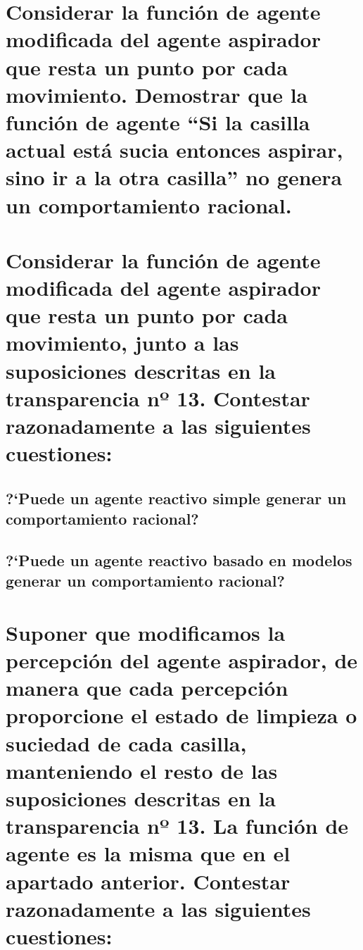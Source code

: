 \documentclass[10pt, a4paper,spanish]{article}
\begin{document}
	\section{Considerar la función de agente modificada del agente aspirador que resta un punto por cada movimiento. Demostrar que la función de agente “Si la casilla actual está sucia entonces aspirar, sino ir a la otra casilla” no genera un comportamiento racional.}

		\paragraph{}



	\section{Considerar la función de agente modificada del agente aspirador que resta un punto por cada movimiento, junto a las suposiciones descritas en la transparencia nº 13. Contestar razonadamente a las siguientes cuestiones:}


		\subsection{?`Puede un agente reactivo simple generar un comportamiento racional?}

			\paragraph{}


		\subsection{?`Puede un agente reactivo basado en modelos generar un comportamiento racional?}

			\paragraph{}



	\section{Suponer que modificamos la percepción del agente aspirador, de manera que cada percepción proporcione el estado de limpieza o suciedad de cada casilla, manteniendo el resto de las suposiciones descritas en la transparencia nº 13. La función de agente es la misma que en el apartado anterior. Contestar razonadamente a las siguientes cuestiones:}
\end{document}
